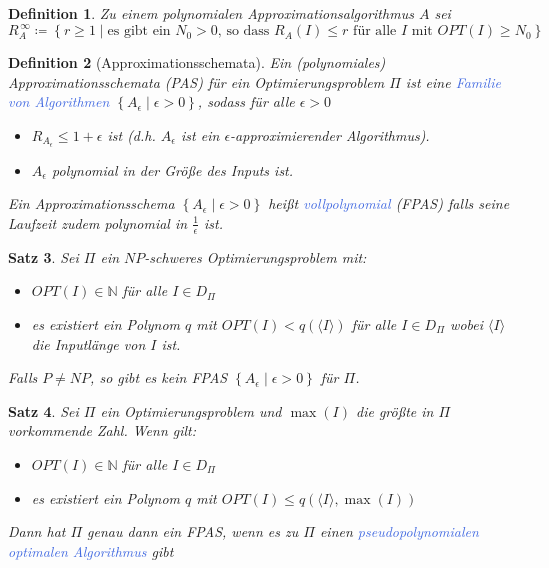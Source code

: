 \documentclass[11pt]{scrartcl}
\newcommand{\tcol}[1]{\textcolor{RoyalBlue}{#1}}
\newcommand{\set}[1]{\left\lbrace #1\right\rbrace}
\theoremstyle{break}
\newtheorem{satz}{Satz}[section]
\newtheorem{defi}[satz]{Definition}
\begin{document}
    \begin{defi}
        Zu einem polynomialen Approximationsalgorithmus $A$ sei
        \[R^{\,\infty}_A\coloneqq\set{r\geq 1 \mid\text{es gibt ein $N_0>0$, so dass $R_A(I)\leq r$ für alle $I$ mit $OPT(I)\geq N_0$}}\]
    \end{defi}

    \begin{defi}[Approximationsschemata]
        Ein (polynomiales) Approximationsschemata (PAS) für ein Optimierungsproblem $\Pi$ ist eine \tcol{Familie von Algorithmen} $\set{A_\epsilon\mid\epsilon>0}$, sodass für alle $\epsilon>0$
        \begin{itemize}
            \item $R_{A_\epsilon}\leq 1+\epsilon$ ist (d.h. $A_\epsilon$ ist ein $\epsilon$-approximierender Algorithmus).
            \item $A_\epsilon$ polynomial in der Größe des Inputs ist.
        \end{itemize}
        Ein Approximationsschema $\set{A_\epsilon\mid\epsilon>0}$ heißt \tcol{vollpolynomial} (FPAS) falls seine Laufzeit zudem polynomial in $\frac{1}{\epsilon}$ ist.
    \end{defi}

    \begin{satz}
        Sei $\Pi$ ein $NP$-schweres Optimierungsproblem mit:
        \begin{itemize}
            \item $OPT(I)\in\mathbb{N}$ für alle $I\in D_\Pi$
            \item es existiert ein Polynom $q$ mit $OPT(I)<q(\langle I\rangle)$ für alle $I\in D_\Pi$ wobei $\langle I\rangle$ die Inputlänge von $I$ ist.
        \end{itemize}
        Falls $P\neq NP$, so gibt es kein FPAS $\set{A_\epsilon\mid\epsilon>0}$ für $\Pi$.
    \end{satz}

    \begin{satz}
        Sei $\Pi$ ein Optimierungsproblem und $\max(I)$ die größte in $\Pi$ vorkommende Zahl.
        Wenn gilt:
        \begin{itemize}
            \item $OPT(I)\in\mathbb{N}$ für alle $I\in D_\Pi$
            \item es existiert ein Polynom $q$ mit $OPT(I)\leq q(\langle I\rangle,\max(I))$
        \end{itemize}
        Dann hat $\Pi$ genau dann ein FPAS, wenn es zu $\Pi$ einen \tcol{pseudopolynomialen optimalen Algorithmus} gibt
    \end{satz}
\end{document}
